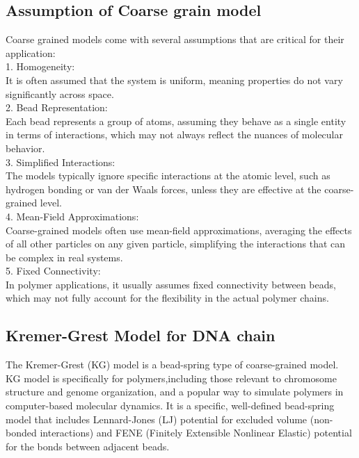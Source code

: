 \documentclass[12pt]{article}
\begin{document}
\begin{flushleft}
\subsection*{Assumption of Coarse grain model}
Coarse grained models come with several assumptions that are critical for their application:\\
    1. Homogeneity:\\
    It is often assumed that the system is uniform, meaning properties do not vary significantly across space. \\
    2. Bead Representation:\\
        Each bead represents a group of atoms, assuming they behave as a single entity in terms of interactions, which may not always reflect the nuances of molecular behavior. \\
    3. Simplified Interactions:\\
        The models typically ignore specific interactions at the atomic level, such as hydrogen bonding or van der Waals forces, unless they are effective at the coarse-grained level. \\
    4. Mean-Field Approximations:\\
        Coarse-grained models often use mean-field approximations, averaging the effects of all other particles on any given particle, simplifying the interactions that can be complex in real systems. \\
    5. Fixed Connectivity:\\
        In polymer applications, it usually assumes fixed connectivity between beads, which may not fully account for the flexibility in the actual polymer chains. \\ 
	
	
	
	
\vspace{-1em} 
	
\subsection*{Kremer-Grest Model for DNA chain}

	
The Kremer-Grest (KG) model is a bead-spring type of coarse-grained model. KG model is specifically for polymers,including those relevant to chromosome structure and genome organization, and a popular way to simulate polymers in computer-based molecular dynamics. It is a specific, well-defined bead-spring model that includes Lennard-Jones (LJ) potential for excluded volume (non-bonded interactions) and FENE (Finitely Extensible Nonlinear Elastic) potential for the bonds between adjacent beads.	



\end{flushleft}
\end{document}
